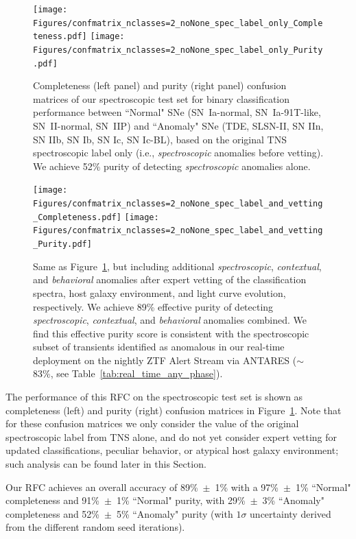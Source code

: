 \documentclass[twocolumn]{aastex63}
\begin{document}
\begin{figure}
    \centering
    \texttt{[image: Figures/confmatrix\_nclasses=2\_noNone\_spec\_label\_only\_Completeness.pdf]}
    \texttt{[image: Figures/confmatrix\_nclasses=2\_noNone\_spec\_label\_only\_Purity.pdf]}
    \caption{
    Completeness (left panel) and purity (right panel) confusion matrices of our spectroscopic test set for binary  classification performance between ``Normal" SNe (SN~Ia-normal, SN~Ia-91T-like, SN~II-normal, SN~IIP) and ``Anomaly" SNe (TDE, SLSN-II, SN IIn, SN IIb, SN Ib, SN Ic, SN Ic-BL), based on the original TNS spectroscopic label only (i.e., \emph{spectroscopic} anomalies before vetting). We achieve 52\% purity of detecting \emph{spectroscopic} anomalies alone.
    } 
    \label{fig:cm_spec_anomalies}
\end{figure}

\begin{figure}
    \centering
    \texttt{[image: Figures/confmatrix\_nclasses=2\_noNone\_spec\_label\_and\_vetting\_Completeness.pdf]}
    \texttt{[image: Figures/confmatrix\_nclasses=2\_noNone\_spec\_label\_and\_vetting\_Purity.pdf]}
    \caption{
    Same as Figure~\ref{fig:cm_spec_anomalies}, but including additional \emph{spectroscopic}, \emph{contextual}, and \emph{behavioral} anomalies after expert vetting of the classification spectra, host galaxy environment, and light curve evolution, respectively. We achieve 89\% effective purity of detecting \emph{spectroscopic}, \emph{contextual}, and \emph{behavioral} anomalies combined. We find this effective purity score is consistent with the spectroscopic subset of transients identified as anomalous in our real-time deployment on the nightly ZTF Alert Stream via ANTARES ($\sim$83\%, see Table~\ref{tab:real_time_any_phase}).
    } 
    \label{fig:cm_context_behavior}
\end{figure}

The performance of this RFC on the spectroscopic test set is shown as completeness (left) and purity (right) confusion matrices in Figure~\ref{fig:cm_spec_anomalies}. Note that for these confusion matrices we only consider the value of the original spectroscopic label from TNS alone, and do not yet consider expert vetting for updated classifications, peculiar behavior, or atypical host galaxy environment; such analysis can be found later in this Section. \par

Our RFC achieves an overall accuracy of 89\%~$\pm$~1\% with a 97\%~$\pm$~1\% ``Normal" completeness and 91\%~$\pm$~1\% ``Normal" purity, with 29\%~$\pm$~3\% ``Anomaly" completeness and 52\%~$\pm$~5\% ``Anomaly" purity (with $1\sigma$ uncertainty derived from the different random seed iterations). \par
\end{document}
